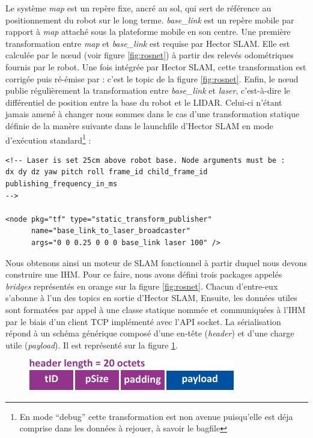 Le système \emph{map} est un repère fixe, ancré au sol, qui sert de référence au positionnement du robot sur le long terme\cite{Bib_frames}.
\emph{base\_link} est un repère mobile par rapport à \emph{map} attaché sous la plateforme mobile en son centre. Une première transformation entre \emph{map} et \emph{base\_link} est requise par \gls{Hector SLAM}. 
Elle est calculée par le n\oe{}ud  (voir figure \ref{fig:rosnet}) à partir des relevés odométriques fournis par le robot.
Une fois intégrée par \gls{Hector SLAM}, cette transformation est corrigée puis ré-émise par  : c'est le topic  de la figure \ref{fig:rosnet}. 
Enfin, le n\oe{}ud  publie régulièrement la transformation entre \emph{base\_link} et \emph{laser}, c'est-à-dire le différentiel de position entre la base du robot et le \gls{LIDAR}. 
Celui-ci n'étant jamais amené à changer nous sommes dans le cas d'une transformation statique définie de la manère suivante dans le launchfile d'Hector SLAM en mode d'exécution 
standard\footnote{En mode ``debug'' cette transformation est non avenue puisqu'elle est déja comprise dans les données à rejouer, à savoir le bagfile} : 

\begin{lstlisting}[style=custombash]
<!-- Laser is set 25cm above robot base. Node arguments must be : 
dx dy dz yaw pitch roll frame_id child_frame_id publishing_frequency_in_ms 
-->

<node pkg="tf" type="static_transform_publisher" 
      name="base_link_to_laser_broadcaster" 
      args="0 0 0.25 0 0 0 base_link laser 100" />  
\end{lstlisting}

Nous obtenons ainsi un moteur de SLAM fonctionnel à partir duquel nous devons construire une \gls{IHM}. 
Pour ce faire, nous avons défini trois packages appelés \emph{bridges} représentés en orange sur la figure \ref{fig:rosnet}. 
Chacun d'entre-eux s'abonne à l'un des topics en sortie d'\gls{Hector SLAM}, 
Ensuite, les données utiles sont formatées par appel à une classe statique nommée  et communiquées à l'\gls{IHM} par le biais d'un client \gls{TCP} implémenté avec l'API socket. 
La sérialisation répond à un schéma générique composé d'une en-tête (\emph{header}) et d'une charge utile (\emph{payload}). Il est représenté sur la figure \ref{fig:buffer}. 

\begin{figure}[h]
  \centering
    \includegraphics[width=.5\linewidth]{figures/buffer}  
  \label{fig:buffer}
\end{figure}

